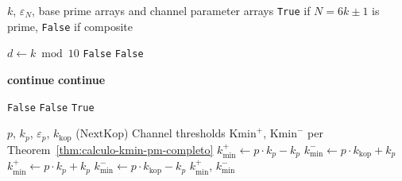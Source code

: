 \documentclass{article}
\numberwithin{equation}{section}
\theoremstyle{plain}
\theoremstyle{definition}
\begin{document}
\begin{algorithm}[htbp]
\caption{IsCandidatePrimeKminPM($k$, $\varepsilon_N$, $\mathcal{P}_{\text{base}}$, $\mathcal{K}_p$, $\mathcal{E}_p$, $\mathcal{K}_{\min}^+$, $\mathcal{K}_{\min}^-$, size)}
\label{alg:is_candidate_kminpm}
\begin{algorithmic}[1]
\Require $k$, $\varepsilon_N$, base prime arrays and channel parameter arrays
\Ensure \texttt{True} if $N = 6k \pm 1$ is prime, \texttt{False} if composite

 
    \State $d \gets k \bmod 10$
        \State \Return \texttt{False}
    \EndIf
        \State \Return \texttt{False}
    \EndIf
\EndIf

     
         \State \textbf{continue} \EndIf
    \Else {}
         \State \textbf{continue} \EndIf
    \EndIf
    
     
            \State \Return \texttt{False}
        \EndIf
    \Else {}
            \State \Return \texttt{False}
        \EndIf
    \EndIf
\EndFor
\State \Return \texttt{True}
\end{algorithmic}
\end{algorithm}

\begin{algorithm}[htbp]
\caption{CalculateKminPM($p$, $k_p$, $\varepsilon_p$, $k_{\text{kop}}$)}
\label{alg:calcular_kmin_pm}
\begin{algorithmic}[1]
\Require $p$, $k_p$, $\varepsilon_p$, $k_{\text{kop}}$ ($\mathrm{NextKop}$)
\Ensure Channel thresholds $\mathrm{Kmin}^+$, $\mathrm{Kmin}^-$ per Theorem~\ref{thm:calculo-kmin-pm-completo}
 
    \State $k_{\min}^+ \gets p \cdot k_p - k_p$ 
    \State $k_{\min}^- \gets p \cdot k_{\text{kop}} + k_p$ 
\Else {}
    \State $k_{\min}^+ \gets p \cdot k_p + k_p$ 
    \State $k_{\min}^- \gets p \cdot k_{\text{kop}} - k_p$ 
\EndIf
\State \Return $k_{\min}^+$, $k_{\min}^-$
\end{algorithmic}
\end{algorithm}
\end{document}
